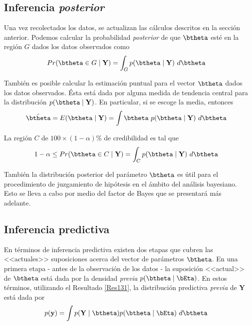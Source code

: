 \subsection{Inferencia \emph{posterior}}
Una vez recolectados los datos, se actualizan las cálculos descritos en la sección anterior. Podemos calcular la probabilidad \emph{posterior} de que $\btheta$ esté en la región $G$ dados los datos observados como
\begin{equation}
Pr(\btheta\in G  \mid \mathbf{Y})=\int_G p(\btheta \mid \mathbf{Y})\ d\btheta
\end{equation}

También es posible calcular la estimación puntual para el vector $\btheta$ dados los datos observados. Ésta está dada por alguna medida de tendencia central para la distribución $p(\btheta \mid \mathbf{Y})$. En particular, si se escoge la media, entonces
\begin{equation}
\hat{\btheta}=E(\btheta \mid \mathbf{Y})=\int \btheta \ p(\btheta \mid \mathbf{Y})\ d\btheta
\end{equation}

La región $C$ de $100\times(1-\alpha)\%$ de credibilidad es tal que
\begin{equation}
1-\alpha \leq Pr(\btheta \in C \mid \mathbf{Y})=\int_Cp(\btheta \mid \mathbf{Y})\ d\btheta
\end{equation}

También la distribución posterior del parámetro $\btheta$ es útil para el procedimiento de juzgamiento de hipótesis en el ámbito del análisis bayesiano. Esto se lleva a cabo por medio del factor de Bayes que se presentará más adelante.

\subsection{Inferencia predictiva}

En términos de inferencia predictiva existen dos etapas que cubren las <<actuales>> suposiciones acerca del vector de parámetros $\btheta$. En una primera etapa - antes de la observación de los datos - la suposición <<actual>> de $\btheta$ está dada por la densidad  \emph{previa} $p(\btheta \mid \bEta)$. En estos términos, utilizando el Resultado \ref{Res131},  la distribución predictiva  \emph{previa} de $\mathbf{Y}$ está dada por
\begin{equation}
p(\mathbf{y})=\int p(\mathbf{Y} \mid \btheta)p(\btheta \mid \bEta)\ d\btheta
\end{equation}

